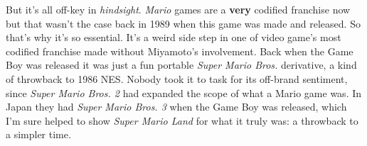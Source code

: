 \documentclass{book}
\begin{document}
\begin{minipage}{0.45\linewidth}\end{minipage}\vspace{2pt}
\begin{minipage}{0.45\linewidth}\end{minipage}\vspace{2pt}
\begin{minipage}{0.45\linewidth}\end{minipage}\vspace{2pt}
\begin{minipage}{0.45\linewidth}\end{minipage}\vspace{2pt}
\begin{minipage}{0.45\linewidth}\end{minipage}\vspace{2pt}
\begin{minipage}{0.45\linewidth}\end{minipage}\vspace{2pt}
\begin{minipage}{0.45\linewidth}\end{minipage}\vspace{2pt}
\begin{minipage}{0.45\linewidth}\end{minipage}
\par\justifying
But it’s all off-key in \emph{hindsight}. \emph{Mario} games are a \textbf{very} codified franchise now but that wasn’t the case back in 1989 when this game was made and released. So that’s why it’s so essential. It’s a weird side step in one of video game’s most codified franchise made without Miyamoto’s involvement. Back when the Game Boy was released it was just a fun portable \emph{Super Mario Bros.} derivative, a kind of throwback to 1986 NES. Nobody took it to task for its off-brand sentiment, since \emph{Super Mario Bros. 2} had expanded the scope of what a Mario game was. In Japan they had \emph{Super Mario Bros. 3} when the Game Boy was released, which I’m sure helped to show \emph{Super Mario Land} for what it truly was: a throwback to a simpler time.\par
\end{document}
